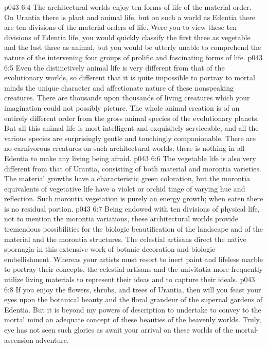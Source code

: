 \pc \vs p043 6:4 The architectural worlds enjoy ten forms of life of the material order. On Urantia there is plant and animal life, but on such a world as Edentia there are ten divisions of the material orders of life. Were you to view these ten divisions of Edentia life, you would quickly classify the first three as vegetable and the last three as animal, but you would be utterly unable to comprehend the nature of the intervening four groups of prolific and fascinating forms of life.
\vs p043 6:5 Even the distinctively animal life is very different from that of the evolutionary worlds, so different that it is quite impossible to portray to mortal minds the unique character and affectionate nature of these nonspeaking creatures. There are thousands upon thousands of living creatures which your imagination could not possibly picture. The whole animal creation is of an entirely different order from the gross animal species of the evolutionary planets. But all this animal life is most intelligent and exquisitely serviceable, and all the various species are surprisingly gentle and touchingly companionable. There are no carnivorous creatures on such architectural worlds; there is nothing in all Edentia to make any living being afraid.
\vs p043 6:6 The vegetable life is also very different from that of Urantia, consisting of both material and morontia varieties. The material growths have a characteristic green coloration, but the morontia equivalents of vegetative life have a violet or orchid tinge of varying hue and reflection. Such morontia vegetation is purely an energy growth; when eaten there is no residual portion.
\vs p043 6:7 Being endowed with ten divisions of physical life, not to mention the morontia variations, these architectural worlds provide tremendous possibilities for the biologic beautification of the landscape and of the material and the morontia structures. The celestial artisans direct the native spornagia in this extensive work of botanic decoration and biologic embellishment. Whereas your artists must resort to inert paint and lifeless marble to portray their concepts, the celestial artisans and the univitatia more frequently utilize living materials to represent their ideas and to capture their ideals.
\vs p043 6:8 If you enjoy the flowers, shrubs, and trees of Urantia, then will you feast your eyes upon the botanical beauty and the floral grandeur of the supernal gardens of Edentia. But it is beyond my powers of description to undertake to convey to the mortal mind an adequate concept of these beauties of the heavenly worlds. Truly, eye has not seen such glories as await your arrival on these worlds of the mortal\hyp{}ascension adventure.
